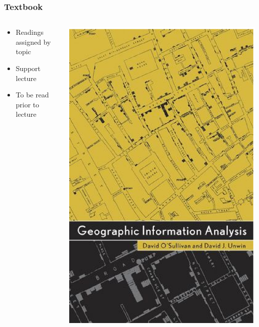 \documentclass{beamer}
\begin{document}
\begin{frame}
\frametitle{Textbook}


\begin{columns}
\begin{block}

\begin{itemize}
\item Readings assigned by topic
\item Support lecture
\item To be read prior to lecture
\end{itemize}

\end{block}


\centerline{\includegraphics[width=1.000000\linewidth,keepaspectratio]{gia.ps}}

\end{columns}

\end{frame}
\end{document}
